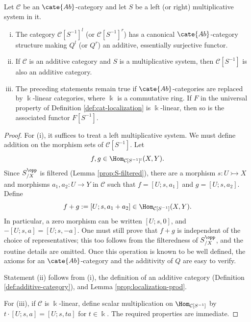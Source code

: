 \begin{theorem}\label{prop:localization-additivity}
	Let $\mathcal{C}$ be an $\cate{Ab}$-category and let $S$ be a left (or
	right) multiplicative system in it.
	\begin{enumerate}[(i)]
		\item The category $\mathcal{C}[S^{-1}]^l$ (or
		$\mathcal{C}[S^{-1}]^r$) has a canonical $\cate{Ab}$-category structure
		making $Q^l$ (or $Q^r$) an additive, essentially surjective functor.
		\item If $\mathcal{C}$ is an additive category and $S$ is a
		multiplicative system, then $\mathcal{C}[S^{-1}]$ is also an additive
		category.
		\item The preceding statements remain true if $\cate{Ab}$-categories are
		replaced by $\Bbbk$-linear categories, where $\Bbbk$ is a commutative
		ring. If $F$ in the universal property of Definition
		\ref{def:cat-localization} is $\Bbbk$-linear, then so is the associated
		functor $F[S^{-1}]$.
	\end{enumerate}
\end{theorem}
\begin{proof}
	For (i), it suffices to treat a left multiplicative system. We must define
	addition on the morphism sets of $\mathcal{C}[S^{-1}]$. Let
	\[
		f,g\in\Hom_{\mathcal{C}[S^{-1}]^l}(X,Y).
	\]
	Since $S_{/X}^{\opp}$ is filtered (Lemma \ref{prop:S-filtered}), there are
	a morphism $s:U\rightarrowtail X$ and morphisms $a_1,a_2:U\to Y$ in
	$\mathcal{C}$ such that $f=[U;s,a_1]$ and $g=[U;s,a_2]$. Define
	\[ f+g:=[U;s,a_1+a_2]\in\Hom_{\mathcal{C}[S^{-1}]}(X,Y). \]
	In particular, a zero morphism can be written $[U;s,0]$, and
	$-[U;s,a]=[U;s,-a]$. One must still prove that $f+g$ is independent of the
	choice of representatives; this too follows from the filteredness of
	$S_{/X}^{\opp}$, and the routine details are omitted. Once this operation
	is known to be well defined, the axioms for an $\cate{Ab}$-category and the
	additivity of $Q$ are easy to verify.

	Statement (ii) follows from (i), the definition of an additive category
	(Definition \ref{def:additive-category}), and Lemma
	\ref{prop:localization-prod}.

	For (iii), if $\mathcal{C}$ is $\Bbbk$-linear, define scalar multiplication
	on $\Hom_{\mathcal{C}[S^{-1}]}$ by
	$t\cdot[U;s,a]=[U;s,ta]$ for $t\in\Bbbk$. The required properties are
	immediate.
\end{proof}

